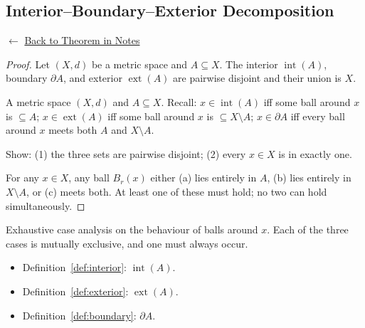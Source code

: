 
\subsection*{Interior--Boundary--Exterior Decomposition}
\label{prf:ibe-decomp}

\begin{remark*}[Return]
$\leftarrow$ \hyperref[thm:ibe-decomp]{Back to Theorem in Notes}
\end{remark*}

\begin{proof}
\Claim Let $(X,d)$ be a metric space and $A \subseteq X$.
The interior $\operatorname{int}(A)$, boundary $\partial A$, and exterior
$\operatorname{ext}(A)$ are pairwise disjoint and their union is $X$.

\Given A metric space $(X,d)$ and $A \subseteq X$.
Recall: $x \in \operatorname{int}(A)$ iff some ball around $x$ is $\subseteq A$;
$x \in \operatorname{ext}(A)$ iff some ball around $x$ is $\subseteq X \setminus A$;
$x \in \partial A$ iff every ball around $x$ meets both $A$ and $X \setminus A$.

\Goal Show: (1) the three sets are pairwise disjoint; (2) every $x \in X$ is in exactly one.

\Strategy For any $x \in X$, any ball $B_r(x)$ either
(a) lies entirely in $A$, (b) lies entirely in $X \setminus A$, or (c) meets both.
At least one of these must hold; no two can hold simultaneously.


\end{proof}

\begin{remark*}
Exhaustive case analysis on the behaviour of balls around $x$.
Each of the three cases is mutually exclusive, and one must always occur.
\end{remark*}

\begin{remark*}[Dependencies]
\begin{itemize}
  \item Definition~\ref{def:interior}: $\operatorname{int}(A)$.
  \item Definition~\ref{def:exterior}: $\operatorname{ext}(A)$.
  \item Definition~\ref{def:boundary}: $\partial A$.
\end{itemize}
\end{remark*}

